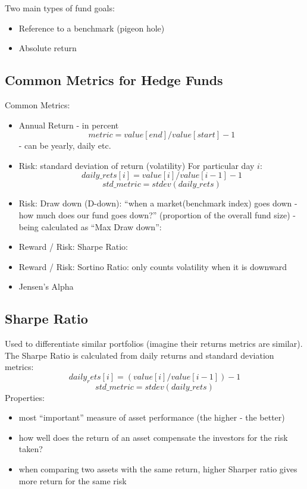 \documentclass{scrartcl}
\begin{document}
Two main types of fund goals:
\begin{itemize}
\item Reference to a benchmark (pigeon hole)
\item Absolute return
\end{itemize}

\subsection{Common Metrics for Hedge Funds}
\label{sec:CommonMetricsHedgeFunds}
Common Metrics:
\begin{itemize}
\item Annual Return - in percent
$$ metric = value[end] / value[start] - 1$$
- can be yearly, daily etc.
\item Risk: standard deviation of return (volatility)
For particular day $i$:
$$daily\_rets[i] = value[i]/value[i-1]-1$$
$$std\_metric = stdev(daily\_rets)$$
\item Risk: Draw down (D-down): ``when a market(benchmark index) goes down - how
  much does our fund goes down?'' (proportion of the overall fund size)  
- being calculated as ``Max Draw down'': 
\item Reward / Risk: Sharpe Ratio:  
\item Reward / Risk: Sortino Ratio: only counts volatility when it is downward
\item Jensen's Alpha
\end{itemize}


\subsection{Sharpe Ratio}
\label{sec:SharpeRatio}

Used to differentiate similar portfolios (imagine their returns metrics are
similar). The Sharpe Ratio is calculated from daily returns and standard
deviation metrics:
$$daily_rets[i] = (value[i]/value[i-1]) - 1$$
$$std\_metric = stdev(daily\_rets)$$
Properties:
\begin{itemize}
\item most ``important'' measure of asset performance (the higher - the better) 
\item how well does the return of an asset compensate the investors for the risk
  taken?
\item when comparing two assets with the same return, higher Sharper ratio gives
  more return for the same risk
\end{itemize}
\end{document}
